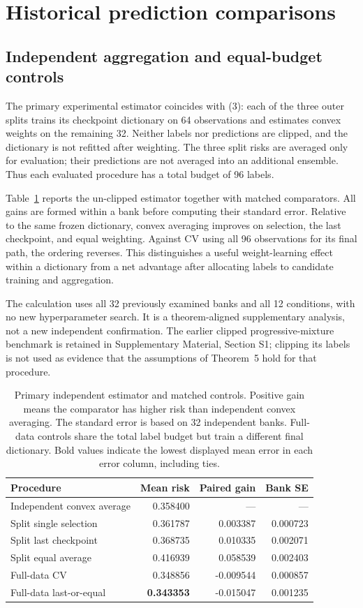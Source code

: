 \documentclass[pdflatex,sn-mathphys-ay]{sn-jnl}
\theoremstyle{remark}\newtheorem{remark}[theorem]{Remark}
\begin{document}
\section{Historical prediction comparisons}
\subsection{Independent aggregation and equal-budget controls}\label{sec:primaryexperiment}
The primary experimental estimator coincides with (3): each of the three outer splits trains its checkpoint dictionary on 64 observations and estimates convex weights on the remaining 32. Neither labels nor predictions are clipped, and the dictionary is not refitted after weighting. The three split risks are averaged only for evaluation; their predictions are not averaged into an additional ensemble. Thus each evaluated procedure has a total budget of 96 labels.

Table~\ref{tab:primary} reports the un-clipped estimator together with matched comparators. All gains are formed within a bank before computing their standard error. Relative to the same frozen dictionary, convex averaging improves on selection, the last checkpoint, and equal weighting. Against CV using all 96 observations for its final path, the ordering reverses. This distinguishes a useful weight-learning effect within a dictionary from a net advantage after allocating labels to candidate training and aggregation.

The calculation uses all 32 previously examined banks and all 12 conditions, with no new hyperparameter search. It is a theorem-aligned supplementary analysis, not a new independent confirmation. The earlier clipped progressive-mixture benchmark is retained in Supplementary Material, Section S1; clipping its labels is not used as evidence that the assumptions of Theorem~5 hold for that procedure.

\begin{table}[htbp]\centering\small
\caption{Primary independent estimator and matched controls. Positive gain means the comparator has higher risk than independent convex averaging. The standard error is based on 32 independent banks. Full-data controls share the total label budget but train a different final dictionary. Bold values indicate the lowest displayed mean error in each error column, including ties.}\label{tab:primary}
\begin{tabular}{lrrr}\toprule Procedure & Mean risk & Paired gain & Bank SE\\\midrule
Independent convex average & 0.358400 & --- & ---\\
Split single selection & 0.361787 & 0.003387 & 0.000723\\
Split last checkpoint & 0.368735 & 0.010335 & 0.002071\\
Split equal average & 0.416939 & 0.058539 & 0.002403\\
Full-data CV & 0.348856 & -0.009544 & 0.000857\\
Full-data last-or-equal & \textbf{0.343353} & -0.015047 & 0.001235\\
\bottomrule\end{tabular}\end{table}
\end{document}
